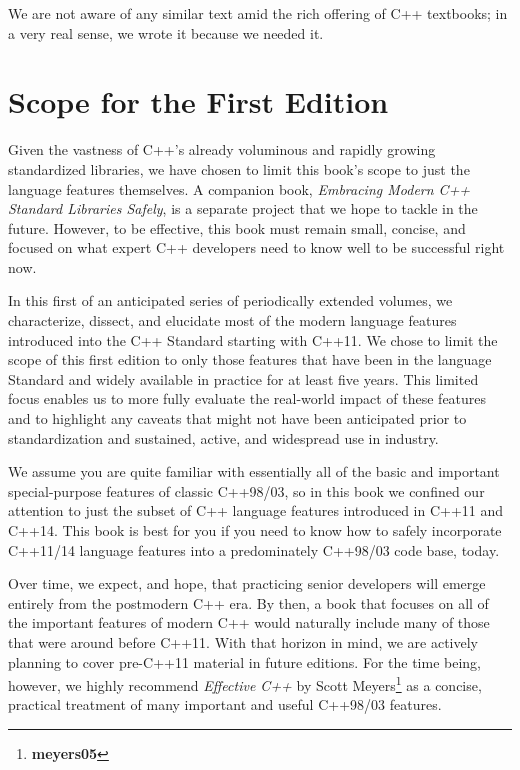 We are not aware of any similar text amid the rich offering of C++ textbooks; in a very real sense, we wrote it because we needed it.

\section{Scope for the First Edition}

Given the vastness of C++'s already voluminous and rapidly growing standardized libraries, we have chosen to limit this book’s scope to just the language features themselves. A companion book, \textit{Embracing Modern C++ Standard Libraries Safely}, is a separate project that we hope to tackle in the future. However, to be effective, this book must remain small, concise, and focused on what expert C++ developers need to know well to be successful right now.

In this first of an anticipated series of periodically extended volumes, we characterize, dissect, and elucidate most of the modern language features introduced into the C++ Standard starting with C++11. We chose to limit the scope of this first edition to only those features that have been in the language Standard and widely available in practice for at least five years. This limited focus enables us to more fully evaluate the real-world impact of these features and to highlight any caveats that might not have been anticipated prior to standardization and sustained, active, and widespread use in industry.\newpage%

We assume you are quite familiar with essentially all of the basic and important special-purpose features of classic C++98/03, so in this book we confined our attention to just the subset of C++ language features introduced in C++11 and C++14. This book is best for you if you need to know how to safely incorporate C++11/14 language features into a predominately C++98/03 code base, today.

Over time, we expect, and hope, that practicing senior developers will emerge entirely from the postmodern C++ era. By then, a book that focuses on all of the important features of modern C++ would naturally include many of those that were around before C++11. With that horizon in mind, we are actively planning to cover pre-C++11 material in future editions. For the time being, however, we highly recommend \textit{Effective C++} by Scott Meyers\footnote{\textbf{meyers05}} as a concise, practical treatment of many important and useful C++98/03 features.

